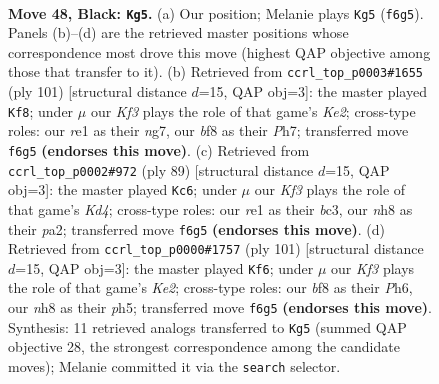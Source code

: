 \documentclass[11pt]{article}
\begin{document}
\clearpage

\begin{figure}[p]\centering
\begin{subfigure}{0.46\textwidth}\centering
\resizebox{\linewidth}{!}{%
\newchessgame
\chessboard[
  setfen={5B1N/p7/P4k2/1P3p2/5b2/3K4/8/4R3 b - - 3 48},
  showmover=false,
  pgfstyle=straightmove, color=movearrow, markmove={f6-g5}
]}
\caption{}
\end{subfigure}\hfill
\begin{subfigure}{0.46\textwidth}\centering
\resizebox{\linewidth}{!}{%
\newchessgame
\chessboard[
  setfen={8/4k1Np/5p2/8/4K1b1/6P1/7P/8 b - - 4 51},
  showmover=false,
  pgfstyle=straightmove, color=movearrow, markmove={e7-f8}
]}
\caption{}
\end{subfigure}
\\[4pt]
\begin{subfigure}{0.46\textwidth}\centering
\resizebox{\linewidth}{!}{%
\newchessgame
\chessboard[
  setfen={8/8/6p1/3k1pb1/2p5/2B5/P3KPP1/8 b - - 7 45},
  showmover=false,
  pgfstyle=straightmove, color=movearrow, markmove={d5-c6}
]}
\caption{}
\end{subfigure}\hfill
\begin{subfigure}{0.46\textwidth}\centering
\resizebox{\linewidth}{!}{%
\newchessgame
\chessboard[
  setfen={8/4kp2/7p/3K1p1P/8/2bN2P1/5P2/8 b - - 0 51},
  showmover=false,
  pgfstyle=straightmove, color=movearrow, markmove={e7-f6}
]}
\caption{}
\end{subfigure}
\caption{\textbf{Move 48, Black: \texttt{Kg5}.} (a) Our position; Melanie plays \texttt{Kg5} (\texttt{f6g5}). Panels (b)--(d) are the retrieved master positions whose correspondence most drove this move (highest QAP objective among those that transfer to it). (b) Retrieved from \texttt{ccrl\_top\_p0003\#1655} (ply 101) [structural distance $d$=15, QAP obj=3]: the master played \texttt{Kf8}; under $\mu$ our \emph{Kf3} plays the role of that game's \emph{Ke2}; cross-type roles: our \emph{r}e1 as their \emph{n}g7, our \emph{b}f8 as their \emph{P}h7; transferred move \texttt{f6g5} \textbf{(endorses this move)}. (c) Retrieved from \texttt{ccrl\_top\_p0002\#972} (ply 89) [structural distance $d$=15, QAP obj=3]: the master played \texttt{Kc6}; under $\mu$ our \emph{Kf3} plays the role of that game's \emph{Kd4}; cross-type roles: our \emph{r}e1 as their \emph{b}c3, our \emph{n}h8 as their \emph{p}a2; transferred move \texttt{f6g5} \textbf{(endorses this move)}. (d) Retrieved from \texttt{ccrl\_top\_p0000\#1757} (ply 101) [structural distance $d$=15, QAP obj=3]: the master played \texttt{Kf6}; under $\mu$ our \emph{Kf3} plays the role of that game's \emph{Ke2}; cross-type roles: our \emph{b}f8 as their \emph{P}h6, our \emph{n}h8 as their \emph{p}h5; transferred move \texttt{f6g5} \textbf{(endorses this move)}. Synthesis: 11 retrieved analogs transferred to \texttt{Kg5} (summed QAP objective 28, the strongest correspondence among the candidate moves); Melanie committed it via the \texttt{search} selector.}
\label{fig:thought-m95}
\end{figure}
\end{document}
